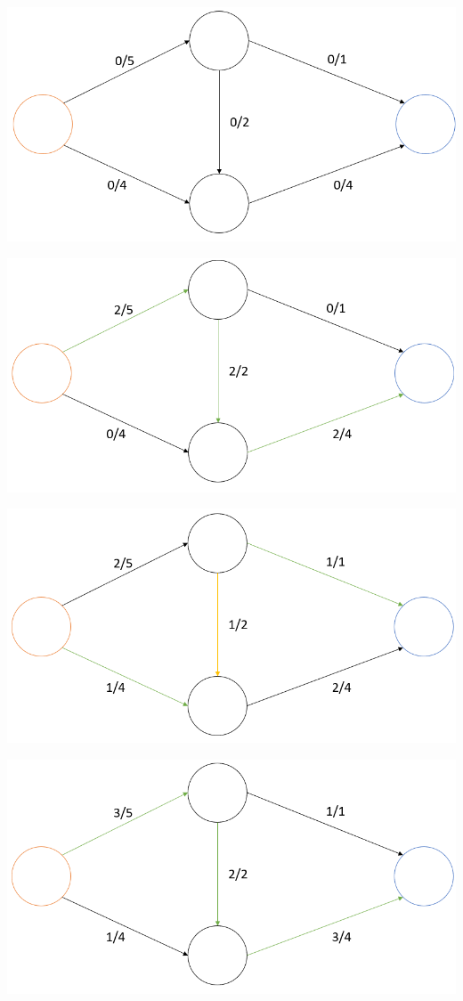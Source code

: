 \includegraphics[scale=0.5]{pics/dop29_1.png}

\includegraphics[scale=0.5]{pics/dop29_2.png}

\includegraphics[scale=0.5]{pics/dop29_3.png}

\includegraphics[scale=0.5]{pics/dop29_4.png}

